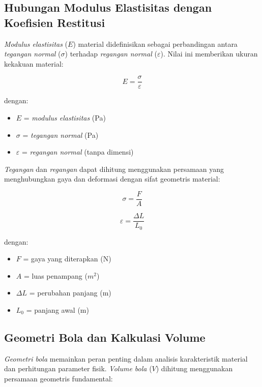 \subsection{Hubungan Modulus Elastisitas dengan Koefisien Restitusi}
\textit{Modulus elastisitas} ($E$) material didefinisikan sebagai perbandingan antara \textit{tegangan normal} ($\sigma$) terhadap \textit{regangan normal} ($\varepsilon$). Nilai ini memberikan ukuran kekakuan material:

\begin{equation}
    E = \frac{\sigma}{\varepsilon}
\end{equation}

dengan:
\begin{itemize}
    \item $E$ = \textit{modulus elastisitas} (Pa)
    \item $\sigma$ = \textit{tegangan normal} (Pa)
    \item $\varepsilon$ = \textit{regangan normal} (tanpa dimensi)
\end{itemize}

\textit{Tegangan} dan \textit{regangan} dapat dihitung menggunakan persamaan yang menghubungkan gaya dan deformasi dengan sifat geometris material:

\begin{equation}
    \sigma = \frac{F}{A}
\end{equation}

\begin{equation}
    \varepsilon = \frac{\Delta L}{L_0}
\end{equation}

dengan:
\begin{itemize}
    \item $F$ = gaya yang diterapkan (N)
    \item $A$ = luas penampang ($m^2$)
    \item $\Delta L$ = perubahan panjang (m)
    \item $L_0$ = panjang awal (m)
\end{itemize}

\subsection{Geometri Bola dan Kalkulasi Volume}
\textit{Geometri bola} memainkan peran penting dalam analisis karakteristik material dan perhitungan parameter fisik. \textit{Volume bola} ($V$) dihitung menggunakan persamaan geometris fundamental:

